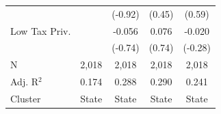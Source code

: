 \begin{tabular*}{\textwidth}{@{\extracolsep{\fill}}lcccc}
                              &               & (-0.92)       & (0.45)       & (0.59)\\   
   Low Tax Priv.              &               & -0.056         & 0.076         & -0.020\\   
                              &               & (-0.74)       & (0.74)       & (-0.28)\\   
   \hline
   N               & 2,018         & 2,018          & 2,018         & 2,018\\  
   Adj. R$^2$             & 0.174         & 0.288          & 0.290         & 0.241\\  
   Cluster              & State & State & State & State\\  
   \bottomrule
\end{tabular*}
\par\endgroup
